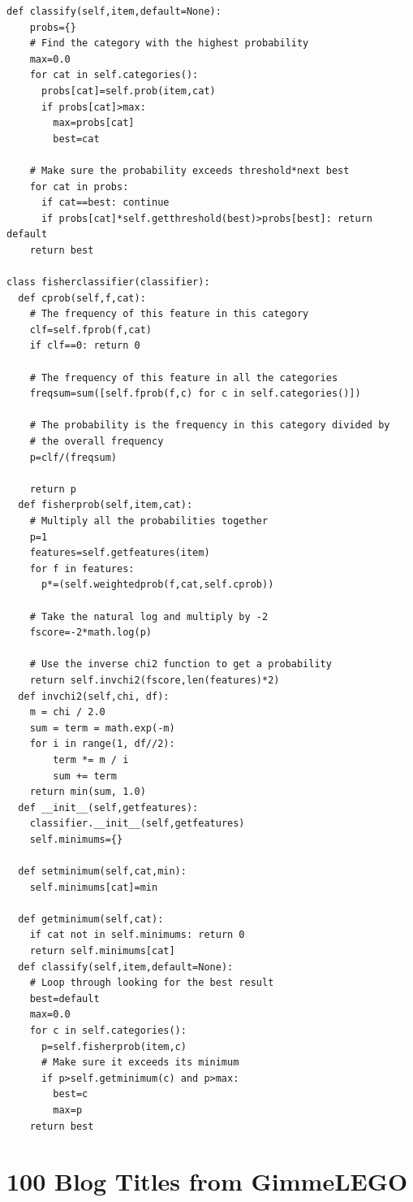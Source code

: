 \documentclass{article}
\begin{document}
\begin{lstlisting}[frame=single, caption=docclass.py, label=docclass]
  def classify(self,item,default=None):
    probs={}
    # Find the category with the highest probability
    max=0.0
    for cat in self.categories():
      probs[cat]=self.prob(item,cat)
      if probs[cat]>max: 
        max=probs[cat]
        best=cat

    # Make sure the probability exceeds threshold*next best
    for cat in probs:
      if cat==best: continue
      if probs[cat]*self.getthreshold(best)>probs[best]: return default
    return best

class fisherclassifier(classifier):
  def cprob(self,f,cat):
    # The frequency of this feature in this category    
    clf=self.fprob(f,cat)
    if clf==0: return 0

    # The frequency of this feature in all the categories
    freqsum=sum([self.fprob(f,c) for c in self.categories()])

    # The probability is the frequency in this category divided by
    # the overall frequency
    p=clf/(freqsum)
    
    return p
  def fisherprob(self,item,cat):
    # Multiply all the probabilities together
    p=1
    features=self.getfeatures(item)
    for f in features:
      p*=(self.weightedprob(f,cat,self.cprob))

    # Take the natural log and multiply by -2
    fscore=-2*math.log(p)

    # Use the inverse chi2 function to get a probability
    return self.invchi2(fscore,len(features)*2)
  def invchi2(self,chi, df):
    m = chi / 2.0
    sum = term = math.exp(-m)
    for i in range(1, df//2):
        term *= m / i
        sum += term
    return min(sum, 1.0)
  def __init__(self,getfeatures):
    classifier.__init__(self,getfeatures)
    self.minimums={}

  def setminimum(self,cat,min):
    self.minimums[cat]=min
  
  def getminimum(self,cat):
    if cat not in self.minimums: return 0
    return self.minimums[cat]
  def classify(self,item,default=None):
    # Loop through looking for the best result
    best=default
    max=0.0
    for c in self.categories():
      p=self.fisherprob(item,c)
      # Make sure it exceeds its minimum
      if p>self.getminimum(c) and p>max:
        best=c
        max=p
    return best
\end{lstlisting}

\section{100 Blog Titles from GimmeLEGO}
\end{document}
